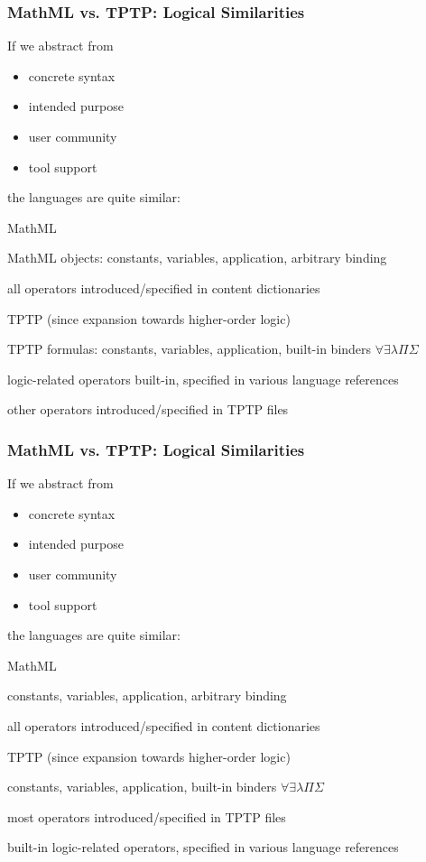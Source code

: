\documentclass{beamer}
\begin{document}
\begin{frame}\frametitle{MathML vs. TPTP: Logical Similarities}
If we abstract from
\begin{itemize}
  \item concrete syntax
  \item intended purpose
  \item user community
  \item tool support
\end{itemize}
the languages are quite similar:

\begin{blockitems}{MathML}
 \item MathML objects: constants, variables, application, arbitrary binding
 \item all operators introduced/specified in content dictionaries
\end{blockitems}
\begin{blockitems}{TPTP (since expansion towards higher-order logic)}
 \item TPTP formulas: constants, variables, application, built-in binders $\forall\exists\lambda\Pi\Sigma$
 \item logic-related operators built-in, specified in various language references
 \item other operators introduced/specified in TPTP files
\end{blockitems}
\end{frame}

\begin{frame}\frametitle{MathML vs. TPTP: Logical Similarities}
If we abstract from
\begin{itemize}
  \item concrete syntax
  \item intended purpose
  \item user community
  \item tool support
\end{itemize}
the languages are quite similar:

\begin{blockitems}{MathML}
 \item constants, variables, application, arbitrary binding
 \item all operators introduced/specified in content dictionaries
\end{blockitems}
\begin{blockitems}{TPTP (since expansion towards higher-order logic)}
 \item constants, variables, application, built-in binders $\forall\exists\lambda\Pi\Sigma$
 \item most operators introduced/specified in TPTP files
 \item built-in logic-related operators, specified in various language references
\end{blockitems}
\end{frame}
\end{document}

